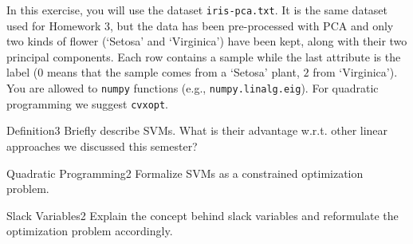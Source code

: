 \newif\ifvimbug
\vimbugfalse

\ifvimbug

\fi

In this exercise, you will use the dataset \texttt{iris-pca.txt}. It is the same dataset used for Homework 3, but the data has been pre-processed with PCA and only two kinds of flower (`Setosa' and `Virginica') have been kept, along with their two principal components. Each row contains a sample while the last attribute is the label ($0$ means that the sample comes from a `Setosa' plant, $2$ from `Virginica').
\\You are allowed to \texttt{numpy} functions (e.g., \texttt{numpy.linalg.eig}). For quadratic programming we suggest \texttt{cvxopt}.
\begin{questions}


\begin{question}{Definition}{3}
Briefly describe SVMs. What is their advantage w.r.t. other linear approaches we discussed this semester? 

\begin{answer}\end{answer}
\end{question}


\begin{question}{Quadratic Programming}{2}
Formalize SVMs as a constrained optimization problem.

\begin{answer}\end{answer}
\end{question}


\begin{question}{Slack Variables}{2}
Explain the concept behind slack variables and reformulate the optimization problem accordingly. 

\begin{answer}\end{answer}
\end{question}



%
\begin{answer}\end{answer}



\end{questions}

